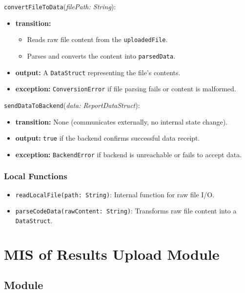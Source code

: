 \documentclass[12pt, titlepage]{article}
\begin{document}
\noindent \texttt{convertFileToData}(\textit{filePath: String}):
\begin{itemize}
    \item \textbf{transition:}
    \begin{itemize}
        \item Reads raw file content from the \texttt{uploadedFile}.
        \item Parses and converts the content into \texttt{parsedData}.
    \end{itemize}
    \item \textbf{output:} A \texttt{DataStruct} representing the file's contents.
    \item \textbf{exception:} \texttt{ConversionError} if file parsing fails or content is malformed.
\end{itemize}

\noindent \texttt{sendDataToBackend}(\textit{data: ReportDataStruct}):
\begin{itemize}
    \item \textbf{transition:} None (communicates externally, no internal state change).
    \item \textbf{output:} \texttt{true} if the backend confirms successful data receipt.
    \item \textbf{exception:} \texttt{BackendError} if backend is unreachable or fails to accept data.
\end{itemize}

\subsubsection{Local Functions}

\begin{itemize}
    \item \texttt{readLocalFile(path: String)}: Internal function for raw file I/O.
    \item \texttt{parseCodeData(rawContent: String)}: Transforms raw file content into a \texttt{DataStruct}.
\end{itemize}

\section{MIS of Results Upload Module} \label{mResultsUpload}

\subsection{Module}
\end{document}
